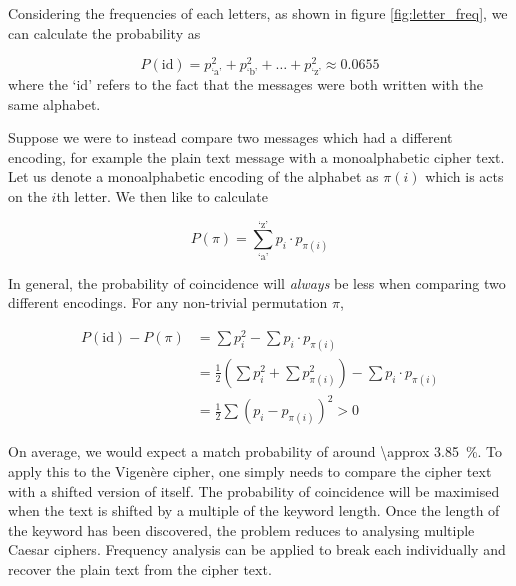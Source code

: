 Considering the frequencies of each letters, as shown in figure \ref{fig:letter_freq}, we can calculate the probability as

\begin{equation}
	P(\mathrm{id}) = p_\text{`a'}^2 + p_\text{`b'}^2 + \dots +p_\text{`z'}^2 \approx 0.0655
\end{equation}
where the `id' refers to the fact that the messages were both written with the same alphabet.

Suppose we were to instead compare two messages which had a different encoding, for example the plain text message with a monoalphabetic cipher text. Let us denote a monoalphabetic encoding of the alphabet as $\pi(i)$ which is acts on the $i$th letter. We then like to calculate

\begin{equation}
	P(\pi) = \sum_\text{`a'}^\text{`z'} p_i \cdot p_{\pi(i)}
\end{equation}

In general, the probability of coincidence will \emph{always} be less when comparing two different encodings. For any non-trivial permutation $\pi$,

\begin{align}
	P(\mathrm{id}) - P(\pi) &= \sum p_i^2 - \sum p_i \cdot p_{\pi(i)}\\
	&= \frac{1}{2}\left(\sum p_i^2 + \sum p_{\pi(i)}^2\right) - \sum p_i \cdot p_{\pi(i)}\\
	&= \frac{1}{2} \sum (p_i - p_{\pi(i)})^2 > 0
\end{align}

On average, we would expect a match probability of around  \SI{\approx 3.85}{\percent}. To apply this to the Vigen\`{e}re cipher, one simply needs to compare the cipher text with a shifted version of itself. The probability of coincidence will be maximised when the text is shifted by a multiple of the keyword length. Once the length of the keyword has been discovered, the problem reduces to analysing multiple Caesar ciphers. Frequency analysis can be applied to break each individually and recover the plain text from the cipher text. 

%

